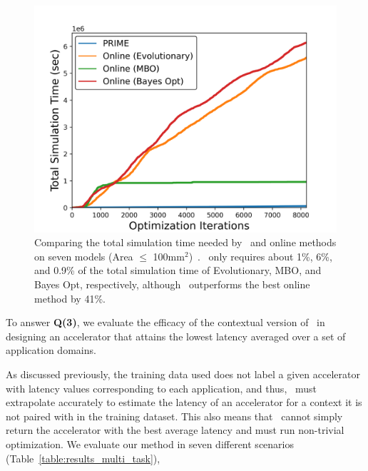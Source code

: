 ~

\begin{figure}
    \centering
    \vspace{-0.5cm}
    \includegraphics[width=0.98\linewidth]{chapters/prime/figs/motivation/convergence_time_seven_models.png}
    \vspace{-0.25cm}
    \caption{\footnotesize{Comparing the total simulation time needed by \primemethodname\ and online methods on seven models (Area $\leq$ 100mm$^2$)~. \primemethodname\ only requires about 1\%, 6\%, and 0.9\% of the total simulation time of Evolutionary, MBO, and Bayes Opt, respectively, although \primemethodname\ outperforms the best online method by 41\%.}}
    \vspace{-0.6cm}
    \label{fig:convergence_time_seven_models}
\end{figure}
%
To answer \textbf{Q(3)}, we evaluate the efficacy of the contextual version of \primemethodname\ in designing an accelerator that attains the lowest latency averaged over a set of application domains.
%

%
As discussed previously, the training data used does not label a given accelerator with latency values corresponding to each application, and thus, \primemethodname\ must extrapolate accurately to estimate the latency of an accelerator for a context it is not paired with in the training dataset.
%
This also means that \primemethodname\ cannot simply return the accelerator with the best average latency and must run non-trivial optimization. 
%
We evaluate our method in seven different scenarios (Table~\ref{table:results_multi_task}), 
